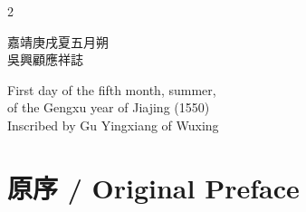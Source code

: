 \documentclass[11pt,a4paper]{article}
\begin{document}
\begin{paracol}{2}
\switchcolumn

\begin{flushright}
嘉靖庚戌夏五月朔\\
吳興顧應祥誌
\end{flushright}

\switchcolumn

\begin{flushright}
First day of the fifth month, summer,\\
of the Gengxu year of Jiajing (1550)\\
Inscribed by Gu Yingxiang of Wuxing
\end{flushright}

\end{paracol}

\clearpage

\section*{原序 / Original Preface}
\end{document}

